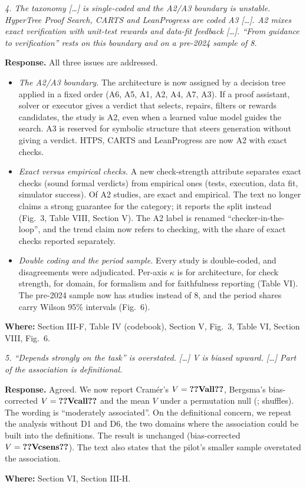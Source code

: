 \documentclass[10pt,a4paper]{article}
\newenvironment{referee}{\par\medskip\noindent\begin{minipage}{\linewidth}\color{black!65}\itshape}{\end{minipage}\par\smallskip}
\newcommand{\resp}{\noindent\textbf{Response.} }
\newcommand{\where}[1]{\par\noindent\textbf{Where:} #1\par}
\begin{document}
\begin{referee}
4. The taxonomy [\ldots] is single-coded and the A2/A3 boundary is unstable. HyperTree Proof Search, CARTS and LeanProgress are coded A3 [\ldots]. A2 mixes exact verification with unit-test rewards and data-fit feedback [\ldots]. ``From guidance to verification'' rests on this boundary and on a pre-2024 sample of 8.
\end{referee}
\resp All three issues are addressed.
\begin{itemize}
  \item \emph{The A2/A3 boundary.} The architecture is now assigned by a decision tree applied in a fixed order (A6, A5, A1, A2, A4, A7, A3). If a proof assistant, solver or executor gives a verdict that selects, repairs, filters or rewards candidates, the study is A2, even when a learned value model guides the search. A3 is reserved for symbolic structure that steers generation without giving a verdict. HTPS, CARTS and LeanProgress are now A2 with exact checks.
  \item \emph{Exact versus empirical checks.} A new check-strength attribute separates exact checks (sound formal verdicts) from empirical ones (tests, execution, data fit, simulator success). Of  A2 studies,  are exact and  empirical. The text no longer claims a strong guarantee for the category; it reports the split instead (Fig.~3, Table VIII, Section V). The A2 label is renamed ``checker-in-the-loop'', and the trend claim now refers to checking, with the share of exact checks reported separately.
  \item \emph{Double coding and the period sample.} Every study is double-coded, and  disagreements were adjudicated. Per-axis $\kappa$ is  for architecture,  for check strength,  for domain,  for formalism and  for faithfulness reporting (Table VI). The pre-2024 sample now has  studies instead of 8, and the period shares carry Wilson 95\% intervals (Fig.~6).
\end{itemize}
\where{Section III-F, Table IV (codebook), Section V, Fig.~3, Table VI, Section VIII, Fig.~6.}

\begin{referee}
5. ``Depends strongly on the task'' is overstated. [\ldots] V is biased upward. [\ldots] Part of the association is definitional.
\end{referee}
\resp Agreed. We now report Cram\'er's $V=\cnt{Vall}$, Bergsma's bias-corrected $V=\cnt{Vcall}$ and the mean $V$ under a permutation null (;  shuffles). The wording is ``moderately associated''. On the definitional concern, we repeat the analysis without D1 and D6, the two domains where the association could be built into the definitions. The result is unchanged (bias-corrected $V=\cnt{Vcsens}$). The text also states that the pilot's smaller sample overstated the association.
\where{Section VI, Section III-H.}
\end{document}
